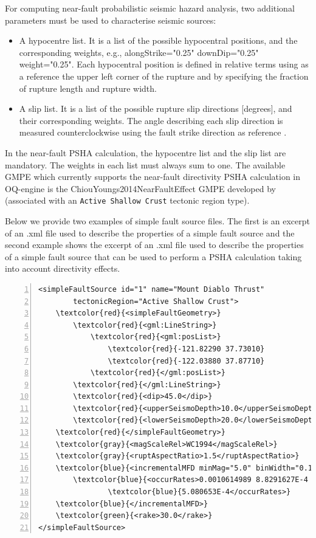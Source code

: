 For computing near-fault probabilistic seismic hazard analysis, two additional
parameters must be used to characterise seismic sources:

\begin{itemize}
\item A hypocentre list. It is a list of the possible hypocentral positions,
and the corresponding weights, e.g., alongStrike="0.25" downDip="0.25"
weight="0.25". Each hypocentral position is defined in relative terms using
as a reference the upper left corner of the rupture and by specifying the
fraction of rupture length and rupture width.

\item A slip list. It is a list of the possible rupture slip directions
[degrees], and their corresponding weights. The angle describing each slip
direction is measured counterclockwise using the fault strike
direction as reference .
\end{itemize}

In the near-fault PSHA calculation, the hypocentre list and the slip list
are mandatory. The weights in each list must always sum to one.
The available GMPE which currently supports the near-fault directivity PSHA
calculation in OQ-engine is the ChiouYoungs2014NearFaultEffect GMPE developed 
by \citet{chiou2014update} (associated with an \texttt{Active Shallow Crust} tectonic region type).

Below we provide two examples of simple fault source files. The first is an excerpt of an .xml file used to describe the properties of a simple fault source and the second example shows the excerpt of an .xml file used to describe the properties of a simple fault source that can be used to perform a PSHA calculation taking into account directivity effects.

\begin{Verbatim}[frame=single, commandchars=\\\{\}, fontsize=\footnotesize,
    numbers=left, numbersep=2pt]
<simpleFaultSource id="1" name="Mount Diablo Thrust"
		tectonicRegion="Active Shallow Crust">
    \textcolor{red}{<simpleFaultGeometry>}
        \textcolor{red}{<gml:LineString>}
            \textcolor{red}{<gml:posList>}
                \textcolor{red}{-121.82290 37.73010}
                \textcolor{red}{-122.03880 37.87710}
            \textcolor{red}{</gml:posList>}
        \textcolor{red}{</gml:LineString>}
        \textcolor{red}{<dip>45.0</dip>}
        \textcolor{red}{<upperSeismoDepth>10.0</upperSeismoDepth>}
        \textcolor{red}{<lowerSeismoDepth>20.0</lowerSeismoDepth>}
    \textcolor{red}{</simpleFaultGeometry>}
    \textcolor{gray}{<magScaleRel>WC1994</magScaleRel>}
    \textcolor{gray}{<ruptAspectRatio>1.5</ruptAspectRatio>}
    \textcolor{blue}{<incrementalMFD minMag="5.0" binWidth="0.1">}
        \textcolor{blue}{<occurRates>0.0010614989 8.8291627E-4 7.3437777E-4 6.108288E-4 }
				\textcolor{blue}{5.080653E-4</occurRates>}
    \textcolor{blue}{</incrementalMFD>}
    \textcolor{green}{<rake>30.0</rake>}
</simpleFaultSource>
\end{Verbatim}
\label{example_incremental_mfd}

